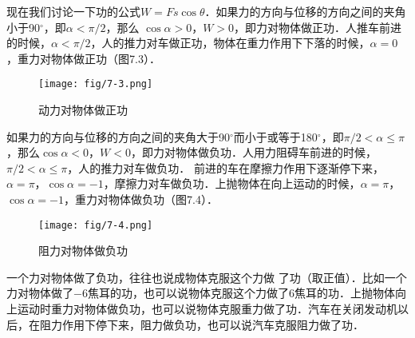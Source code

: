 现在我们讨论一下功的公式$W=Fs\cos\theta$．如果力的方向与位移的方向之间的夹角小于90$^\circ$，即$\alpha<\pi/2$，那么
$\cos\alpha>0$，$W>0$，即力对物体做正功．人推车前进的时候，$\alpha<\pi/2$，人的推力对车做正功，物体在重力作用下下落的时候，$\alpha=0$，重力对物体做正功（图7.3）．
\begin{figure}[htp]
\centering\texttt{[image: fig/7-3.png]}
\caption{动力对物体做正功}
\end{figure}

如果力的方向与位移的方向之间的夹角大于90$^\circ$而小于或等于180$^\circ$，即$\pi/2<\alpha\le \pi$，那么$\cos\alpha <0$，$W<0$，即力对物体做负功．人用力阻碍车前进的时候，$\pi/2<\alpha\le \pi$，人的推力对车做负功．
前进的车在摩擦力作用下逐渐停下来，$\alpha=\pi$，$\cos\alpha=-1$，摩擦力对车做负功．上抛物体在向上运动的时候，$\alpha=\pi$，$\cos\alpha=-1$，重力对物体做负功（图7.4）．
	\begin{figure}[htp]
\centering\texttt{[image: fig/7-4.png]}
\caption{阻力对物体做负功}
\end{figure}

一个力对物体做了负功，往往也说成物体克服这个力做
了功（取正值）．比如一个力对物体做了$-6$焦耳的功，也可以说物体克服这个力做了6焦耳的功．上抛物体向上运动时重力对物体做负功，也可以说物体克服重力做了功．汽车在关闭发动机以后，在阻力作用下停下来，阻力做负功，也可以说汽车克服阻力做了功．


